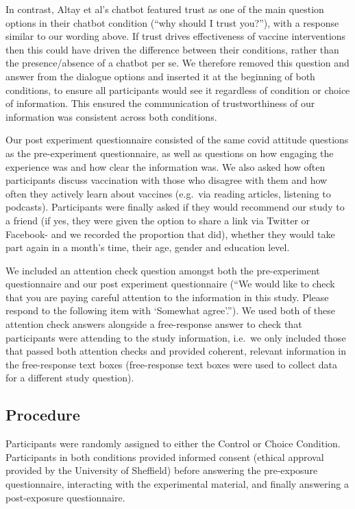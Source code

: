 \documentclass[
  english,
  ,jou,floatsintext]{apa6}
\begin{document}
In contrast, Altay et al's chatbot featured trust as one of the main question options in their chatbot condition (``why should I trust you?''), with a response similar to our wording above. If trust drives effectiveness of vaccine interventions then this could have driven the difference between their conditions, rather than the presence/absence of a chatbot per se. We therefore removed this question and answer from the dialogue options and inserted it at the beginning of both conditions, to ensure all participants would see it regardless of condition or choice of information. This ensured the communication of trustworthiness of our information was consistent across both conditions.

Our post experiment questionnaire consisted of the same covid attitude questions as the pre-experiment questionnaire, as well as questions on how engaging the experience was and how clear the information was. We also asked how often participants discuss vaccination with those who disagree with them and how often they actively learn about vaccines (e.g.~via reading articles, listening to podcasts). Participants were finally asked if they would recommend our study to a friend (if yes, they were given the option to share a link via Twitter or Facebook- and we recorded the proportion that did), whether they would take part again in a month's time, their age, gender and education level.

We included an attention check question amongst both the pre-experiment questionnaire and our post experiment questionnaire (``We would like to check that you are paying careful attention to the information in this study. Please respond to the following item with `Somewhat agree'.''). We used both of these attention check answers alongside a free-response answer to check that participants were attending to the study information, i.e.~we only included those that passed both attention checks and provided coherent, relevant information in the free-response text boxes (free-response text boxes were used to collect data for a different study question).

\hypertarget{procedure}{%
\subsection{Procedure}\label{procedure}}

Participants were randomly assigned to either the Control or Choice Condition. Participants in both conditions provided informed consent (ethical approval provided by the University of Sheffield) before answering the pre-exposure questionnaire, interacting with the experimental material, and finally answering a post-exposure questionnaire.
\end{document}
